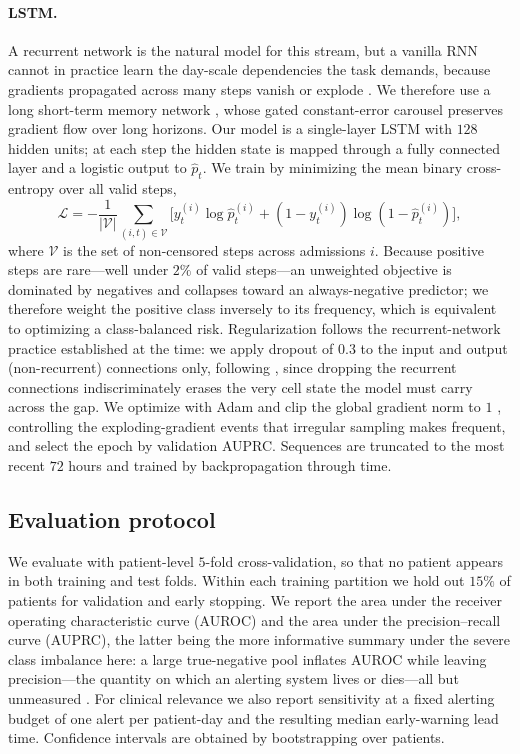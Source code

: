 \documentclass{article}
\begin{document}
\paragraph{LSTM.} A recurrent network is the natural model for this stream, but a
vanilla RNN cannot in practice learn the day-scale dependencies the task demands,
because gradients propagated across many steps vanish or explode
\citep{Bengio1994,Pascanu2013}. We therefore use a long short-term memory network
\citep{Hochreiter1997}, whose gated constant-error carousel preserves gradient flow
over long horizons. Our model is a single-layer LSTM with $128$ hidden units; at each
step the hidden state is mapped through a fully connected layer and a logistic output
to $\hat{p}_t$. We train by minimizing
the mean binary cross-entropy over all valid steps,
\begin{equation}
\mathcal{L} = -\frac{1}{|\mathcal{V}|} \sum_{(i,t) \in \mathcal{V}}
\Big[ y^{(i)}_t \log \hat{p}^{(i)}_t + (1 - y^{(i)}_t) \log (1 - \hat{p}^{(i)}_t) \Big],
\end{equation}
where $\mathcal{V}$ is the set of non-censored steps across admissions $i$. Because
positive steps are rare---well under $2\%$ of valid steps---an unweighted objective is
dominated by negatives and collapses toward an always-negative predictor; we therefore
weight the positive class inversely to its frequency, which is equivalent to optimizing
a class-balanced risk. Regularization follows the recurrent-network practice
established at the time: we apply dropout \citep{Srivastava2014} of $0.3$ to the input
and output (non-recurrent) connections only, following \citet{Zaremba2014}, since
dropping the recurrent connections indiscriminately erases the very cell state the
model must carry across the gap. We optimize with Adam \citep{Kingma2015} and clip the
global gradient norm to $1$ \citep{Pascanu2013}, controlling the exploding-gradient
events that irregular sampling makes frequent, and select the epoch by validation
AUPRC. Sequences are truncated to the most recent $72$ hours and trained by
backpropagation through time.

\subsection{Evaluation protocol}

We evaluate with patient-level $5$-fold cross-validation, so that no patient appears
in both training and test folds. Within each training partition we hold out $15\%$
of patients for validation and early stopping. We report the area under the
receiver operating characteristic curve (AUROC) and the area under the
precision--recall curve (AUPRC), the latter being the more informative summary under
the severe class imbalance here: a large true-negative pool inflates AUROC while
leaving precision---the quantity on which an alerting system lives or dies---all but
unmeasured \citep{Davis2006}. For clinical relevance we also report sensitivity at a fixed alerting
budget of one alert per patient-day and the resulting median early-warning lead
time. Confidence intervals are obtained by bootstrapping over patients.
\end{document}
